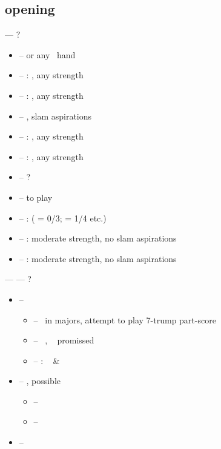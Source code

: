\subsection{ opening}
\label{subsec:1nt-op}

 --- ?
\begin{itemize}
  \item {} --   or any \inv\ hand
  \item {} -- : , any strength
  \item {} -- : , any strength
  \item {} --  , slam aspirations
  \item {} -- : , any strength
  \item {} -- : , any strength
  \item {} -- ?
  \item {} -- \nat\/ to play
  \item {} -- :  ( = 0/3;  = 1/4 etc.)
  \item {} -- :  moderate strength, no slam aspirations
  \item {} -- :  moderate strength, no slam aspirations
\end{itemize}

\vspace{1em}

 ---  --- ?
\begin{itemize}
  \item {} -- \art\ \no\ 
  \begin{itemize}
    \item {} -- \so\ in majors, attempt to play 7-trump part-score
    \item {} -- \nat\ \inv, \no\  promissed
    \item {} -- : \gf\  \& 
  \end{itemize}
  \item {} -- , possible 
  \begin{itemize}
    \item {} -- \inv\ 
    \item {} -- \inv\ \no\ 
  \end{itemize}
  \item {} -- 
\end{itemize}

